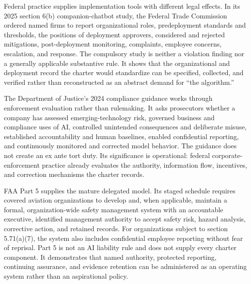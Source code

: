 Federal practice supplies implementation tools with different legal effects. In its 2025 section 6(b) companion-chatbot study, the Federal Trade Commission ordered named firms to report organizational roles, predeployment standards and thresholds, the positions of deployment approvers, considered and rejected mitigations, post-deployment monitoring, complaints, employee concerns, escalation, and response. The compulsory study is neither a violation finding nor a generally applicable substantive rule. It shows that the organizational and deployment record the charter would standardize can be specified, collected, and verified rather than reconstructed as an abstract demand for ``the algorithm.''

The Department of Justice's 2024 compliance guidance works through enforcement evaluation rather than rulemaking. It asks prosecutors whether a company has assessed emerging-technology risk, governed business and compliance uses of AI, controlled unintended consequences and deliberate misuse, established accountability and human baselines, enabled confidential reporting, and continuously monitored and corrected model behavior. The guidance does not create an ex ante tort duty. Its significance is operational: federal corporate-enforcement practice already evaluates the authority, information flow, incentives, and correction mechanisms the charter records.

FAA Part 5 supplies the mature delegated model. Its staged schedule requires covered aviation organizations to develop and, when applicable, maintain a formal, organization-wide safety management system with an accountable executive, identified management authority to accept safety risk, hazard analysis, corrective action, and retained records. For organizations subject to section 5.71(a)(7), the system also includes confidential employee reporting without fear of reprisal. Part 5 is not an AI liability rule and does not supply every charter component. It demonstrates that named authority, protected reporting, continuing assurance, and evidence retention can be administered as an operating system rather than an aspirational policy.

